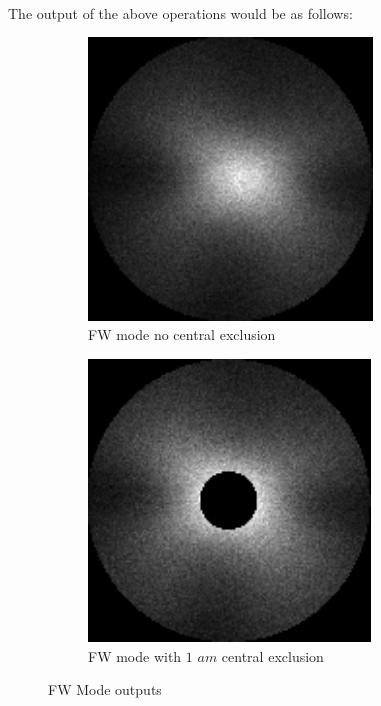 \documentclass[a4paper,twoside]{report}
\numberwithin{equation}{section}
\begin{document}
\paragraph{}
The output of the above operations would be as follows:
\begin{figure}[h]
\begin{subfigure}{0.48\textwidth}
\includegraphics[width=1.0\linewidth, height=7.5cm]{FWF2_5am.jpeg} 
\caption{FW mode no central exclusion}
\label{FW_5am}
\end{subfigure}
\begin{subfigure}{0.48\textwidth}
\includegraphics[width=1.0\linewidth, height=7.5cm]{FWF2_5am_1am.jpeg}
\caption{FW mode with $1$ $am$ central exclusion}
\label{FW_5am_1am}
\end{subfigure}
\caption{FW Mode outputs}
\label{FW_op}
\end{figure}
\end{document}
